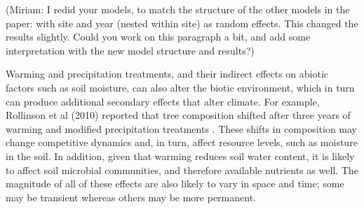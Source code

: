 \documentclass{article}
\begin{document}
\par (Miriam: I redid your models, to match the structure of the other models in the paper: with site and year (nested within site) as random effects. This changed the results slightly. Could you work on this paragraph a bit, and add some interpretation with the new model structure and results?) %
\par Warming and precipitation treatments, and their indirect effects on abiotic factors such as soil moisture, can also alter the biotic environment, which in turn can produce additional secondary effects that alter climate. For example, Rollinson et al (2010) reported that tree composition shifted after three years of warming and modified precipitation treatments \citep{rollinson2012}. These shifts in composition may change competitive dynamics and, in turn, affect resource levels, such as moisture in the soil. In addition, given that warming reduces soil water content, it is likely to affect soil microbial communities, and therefore available nutrients as well. The magnitude of all of these effects are also likely to vary in space and time; some may be transient whereas others may be more permanent. 
\end{document}
